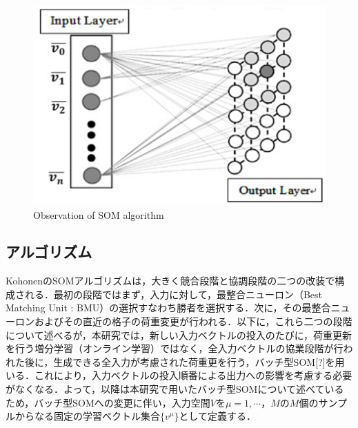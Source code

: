 \clearpage %

\begin{figure}[ht]
  \begin{center}
  
    \includegraphics[clip,width=15.0cm]{figure/02_01_Overview_of_SOM_algorithm.eps}
    \caption{Observation of SOM algorithm}
    \label{fig:SOM_Algorithm}
    
  \end{center}
\end{figure}

\clearpage%


\subsection{アルゴリズム}
KohonenのSOMアルゴリズム\cite{Kohonen}は，大きく競合段階と協調段階の二つの改装で構成される．最初の段階ではまず，入力に対して，最整合ニューロン（Best Matching Unit : BMU）の選択すなわち勝者を選択する．次に，その最整合ニューロンおよびその直近の格子の荷重変更が行われる．以下に，これら二つの段階について述べるが，本研究では，新しい入力ベクトルの投入のたびに，荷重更新を行う増分学習（オンライン学習）ではなく，全入力ベクトルの協業段階が行われた後に，生成できる全入力が考慮された荷重更を行う，バッチ型SOM[?]を用いる．これにより，入力ベクトルの投入順番による出力への影響を考慮する必要がなくなる．よって，以降は本研究で用いたバッチ型SOMについて述べているため，バッチ型SOMへの変更に伴い，入力空間$V$を$ \mu = 1, \cdots，M$の$M$個のサンプルからなる固定の学習ベクトル集合$\{v^\mu\}$として定義する．

